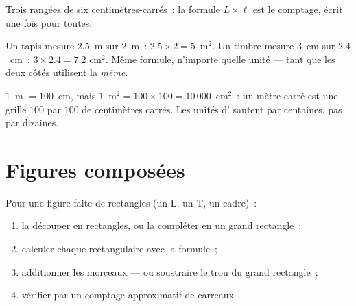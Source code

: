\begin{omfigure}

{\small Trois rangées de six centimètres-carrés~: la formule
$L \times \ell$ est le comptage, écrit une fois pour toutes.}
\end{omfigure}

\begin{example}\label{ex:g5:areas:rectangle}
Un tapis mesure $2.5$~m sur $2$~m~:  $2.5 \times 2 = 5$~m$^2$.
Un timbre mesure $3$~cm sur $2.4$~cm~:  $3 \times 2.4 = 7.2$
cm$^2$. Même formule, n'importe quelle unité --- tant que les deux
côtés utilisent la \emph{même}.
\end{example}

\begin{example}\label{ex:g5:areas:units}
$1$~m $= 100$~cm, mais $1$~m$^2 = 100 \times 100 = 10\,000$~cm$^2$~:
un mètre carré est une grille $100$ par $100$ de centimètres
carrés. Les unités d' sautent par centaines, pas par dizaines.
\end{example}

\section{Figures composées}

\begin{method}\label{met:g5:areas:composite}
Pour une figure faite de rectangles (un L, un T, un cadre)~:
\begin{enumerate}
  \item la découper en rectangles, ou la compléter en un grand
        rectangle~;
  \item calculer chaque  rectangulaire avec la formule~;
  \item additionner les morceaux --- ou soustraire le trou du grand
        rectangle~;
  \item vérifier par un comptage approximatif de carreaux.
\end{enumerate}
\end{method}

